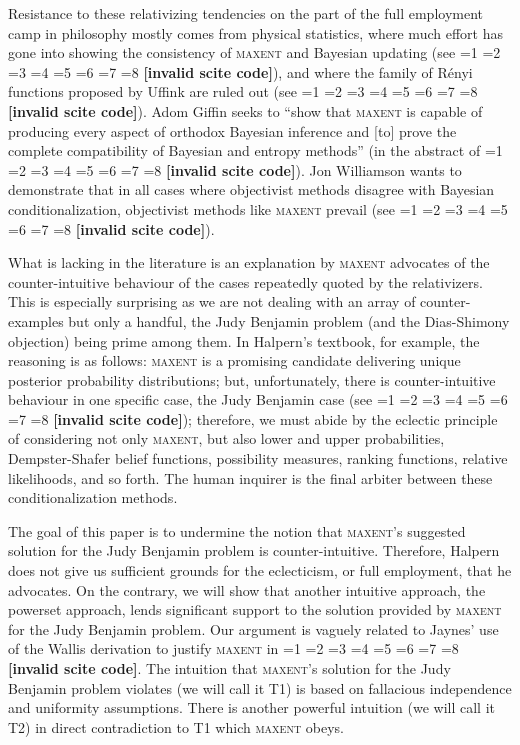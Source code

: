 \documentclass[12pt]{article}
\newcommand{\tbd}[1]{}
\newcommand{\qeins}[1]{``#1''}
\newif\ifNumericalOrYear
\newcommand{\PageP}{p.~}
\newcommand{\PageP}{}
\newcommand{\scite}[3]{\ifnum#1=1\ifNumericalOrYear\citep{#2}\else\citeyearpar{#2}\fi\else
\ifnum#1=2\ifNumericalOrYear\citep[#3]{#2}\else\citep[{\PageP}#3]{#2}\fi\else
\ifnum#1=3\ifNumericalOrYear(\citet[#3]{#2})\else\citep[{\PageP}#3]{#2}\fi\else
\ifnum#1=4\ifNumericalOrYear\citet{#2}\else\citet{#2}\fi\else
\ifnum#1=5\ifNumericalOrYear(\citet{#2})\else\citep{#2}\fi\else
\ifnum#1=6\ifNumericalOrYear(\citet[#3]{#2})\else\citep[{\PageP}#3]{#2}\fi\else
\ifnum#1=7\ifNumericalOrYear\citep{#2}\else\citealp{#2}\fi\else
\ifnum#1=8\ifNumericalOrYear\citep[#3]{#2}\else\citealp[{\PageP}#3]{#2}\fi\else
\textbf{[invalid scite code]}\fi\fi\fi\fi\fi\fi\fi\fi}
\begin{document}
Resistance to these relativizing tendencies on the part of the full
employment camp in philosophy mostly comes from physical statistics,
where much effort has gone into showing the consistency of
\textsc{maxent} and Bayesian updating (see
\scite{7}{catichagiffin06}{}), and where the family of R{\'e}nyi
functions proposed by Uffink are ruled out (see
\scite{7}{giffin08}{}). Adom Giffin seeks to \qeins{show that
  \textsc{maxent} is capable of producing every aspect of orthodox
  Bayesian inference and [to] prove the complete compatibility of
  Bayesian and entropy methods} (in the abstract of
\scite{7}{giffin08}{}). Jon Williamson wants to demonstrate that in
all cases where objectivist methods disagree with Bayesian
conditionalization, objectivist methods like \textsc{maxent} prevail
(see \scite{7}{williamson09}{}).

What is lacking in the literature is an explanation by \textsc{maxent}
advocates of the counter-intuitive behaviour of the cases repeatedly
quoted by the relativizers. This is especially surprising as we are
not dealing with an array of counter-examples but only a handful, the
Judy Benjamin problem (and the Dias-Shimony objection) being prime
among them. In Halpern's textbook, for example, the reasoning is as
follows: \textsc{maxent} is a promising candidate delivering unique
posterior probability distributions; but, unfortunately, there is
counter-intuitive behaviour in one specific case, the Judy Benjamin
case (see \scite{8}{halpern03}{})\tbd{provide reference}; therefore,
we must abide by the eclectic principle of considering not only
\textsc{maxent}, but also lower and upper probabilities,
Dempster-Shafer belief functions, possibility measures, ranking
functions, relative likelihoods, and so forth. The human inquirer is
the final arbiter between these conditionalization methods.

The goal of this paper is to undermine the notion that
\textsc{maxent}'s suggested solution for the Judy Benjamin problem is
counter-intuitive. Therefore, Halpern does not give us sufficient
grounds for the eclecticism, or full employment, that he advocates. On
the contrary, we will show that another intuitive approach, the
powerset approach, lends significant support to the solution provided
by \textsc{maxent} for the Judy Benjamin problem. Our argument is
vaguely related to Jaynes' use of the Wallis derivation to justify
\textsc{maxent} in \scite{8}{jaynes98}{351ff}. The intuition that
\textsc{maxent}'s solution for the Judy Benjamin problem violates (we
will call it T1) is based on fallacious independence and uniformity
assumptions. There is another powerful intuition (we will call it T2)
in direct contradiction to T1 which \textsc{maxent} obeys.
\end{document}
